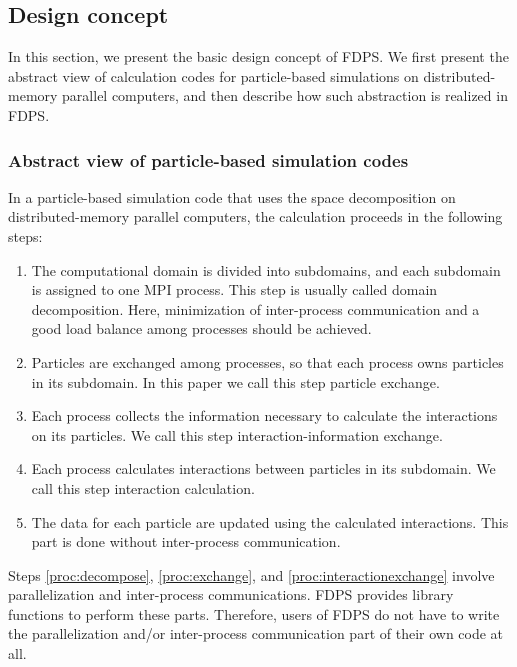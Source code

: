 \subsection{Design concept}
\label{sec:design}

In this section, we present the basic design concept of FDPS. We first
present the abstract view of calculation codes for particle-based
simulations on distributed-memory parallel computers, and then
describe how such abstraction is realized in FDPS.


\subsubsection{Abstract view of particle-based simulation codes}
\label{sec:view}

In a particle-based simulation code that uses the space decomposition on
distributed-memory parallel computers, the calculation proceeds in the
following steps:
\begin{enumerate}

\item The computational domain is divided into subdomains, and each
  subdomain is assigned to one MPI process. This step is usually
  called domain decomposition. Here, minimization of inter-process
  communication and a good load balance among  processes should be
  achieved.
 \label{proc:decompose}

\item Particles are exchanged among  processes, so that each
  process owns particles in its subdomain. In this paper we call this
  step particle exchange.
  \label{proc:exchange}

\item Each process collects the information necessary to calculate the
  interactions on its particles. We call this step
  interaction-information exchange.
  \label{proc:interactionexchange}

\item Each process calculates interactions between particles in its
  subdomain. We call this step interaction calculation.
  \label{proc:interaction}

\item The data for each particle are updated using the calculated
  interactions. This part is done without inter-process communication.
   \label{proc:local}
\end{enumerate}

Steps \ref{proc:decompose}, \ref{proc:exchange}, and
\ref{proc:interactionexchange} involve parallelization and
inter-process communications. FDPS provides library functions to
perform these parts. Therefore, users of FDPS do not have to write the
parallelization and/or inter-process communication part of their own
code at all.

